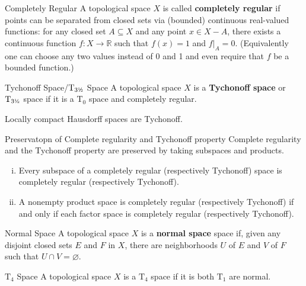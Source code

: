 \documentclass{report}
\begin{document}
\begin{definition}{Completely Regular}{}
	A topological space $X$ is called \textbf{completely regular} if points can be separated from closed sets via (bounded) continuous real-valued functions: for any closed set $A \subseteq X$ and any point $x \in X - A$, there exists a continuous function $f: X \rightarrow \mathbb{R}$ such that $f(x)=1$ and $\left.f\right|_A=0$. (Equivalently one can choose any two values instead of 0 and 1 and even require that $f$ be a bounded function.)
\end{definition}

\begin{definition}{Tychonoff Space/$\mathrm{T}_{3 \text{\textonehalf}}$ Space}{}
	A topological space $X$ is a \textbf{Tychonoff space} or $\mathrm{T}_{3\text{\textonehalf}}$ space if it is a $\mathrm{T}_0$ space and completely regular.
\end{definition}

\begin{proposition}{}{}
	Locally compact Hausdorff spaces are Tychonoff.
\end{proposition}

\begin{proposition}{Preservatopn of Complete regularity and Tychonoff property}{}
    Complete regularity and the Tychonoff property are preserved by taking subspaces and products. 
	\begin{enumerate}[(i)]
		\item Every subspace of a completely regular (respectively Tychonoff) space is completely regular (respectively Tychonoff).
		\item A nonempty product space is completely regular (respectively Tychonoff) if and only if each factor space is completely regular (respectively Tychonoff).
	\end{enumerate}
\end{proposition}

\begin{definition}{Normal Space}{}
	A topological space $X$ is a \textbf{normal space} space if, given any disjoint closed sets $E$ and $F$ in $X$, there are neighborhoods $U$ of $E$ and $V$ of $F$ such that $U\cap V=\varnothing$.
\end{definition}
\begin{definition}{$\mathrm{T}_4$ Space}{}
	A topological space $X$ is a $\mathrm{T}_4$ space if it is both $\mathrm{T}_1$ are normal.
\end{definition}
\end{document}
